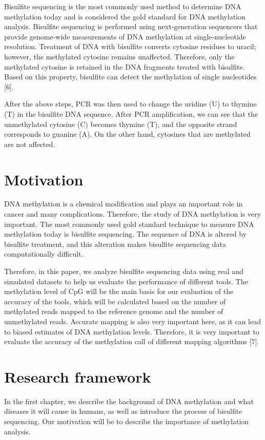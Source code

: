 \documentclass{PHlab-thesis}
\begin{document}
\par 
Bisulfite sequencing is the most commonly used method to determine DNA methylation today and is considered the gold standard for DNA methylation analysis. Bisulfite sequencing is performed using next-generation sequencers that provide genome-wide measurements of DNA methylation at single-nucleotide resolution. Treatment of DNA with bisulfite converts cytosine residues to uracil; however, the methylated cytosine remains unaffected. Therefore, only the methylated cytosine is retained in the DNA fragments treated with bisulfite. Based on this property, bisulfite can detect the methylation of single nucleotides [6].

\par 
After the above steps, PCR was then used to change the uridine (U) to thymine (T) in the bisulfite DNA sequence. After PCR amplification, we can see that the unmethylated cytosine (C) becomes thymine (T), and the opposite strand corresponds to guanine (A). On the other hand, cytosines that are methylated are not affected.

\section{Motivation}
DNA methylation is a chemical modification and plays an important role in cancer and many complications. Therefore, the study of DNA methylation is very important. The most commonly used gold standard technique to measure DNA methylation today is bisulfite sequencing. The sequence of DNA is altered by bisulfite treatment, and this alteration makes bisulfite sequencing data computationally difficult.

\par 
Therefore, in this paper, we analyze bisulfite sequencing data using real and simulated datasets to help us evaluate the performance of different tools. The methylation level of CpG will be the main basis for our evaluation of the accuracy of the tools, which will be calculated based on the number of methylated reads mapped to the reference genome and the number of unmethylated reads. Accurate mapping is also very important here, as it can lead to biased estimates of DNA methylation levels. Therefore, it is very important to evaluate the accuracy of the methylation call of different mapping algorithms [7].

\section{Research framework}
In the first chapter, we describe the background of DNA methylation and what diseases it will cause in humans, as well as introduce the process of bisulfite sequencing. Our motivation will be to describe the importance of methylation analysis.
\end{document}
